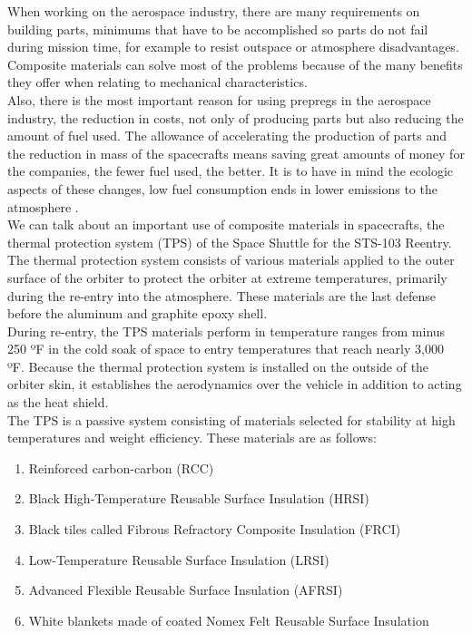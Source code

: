 When working on the aerospace industry, there are many requirements on building parts, minimums that have to be accomplished so parts do not fail during mission time, for example to resist outspace or atmosphere disadvantages. Composite materials can solve most of the problems because of the many benefits they offer when relating to mechanical characteristics.\\

Also, there is the most important reason for using prepregs in the aerospace industry, the reduction in costs, not only of producing parts but also reducing the amount of fuel used. The allowance of accelerating the production of parts and the reduction in mass of the spacecrafts means saving great amounts of money for the companies, the fewer fuel used, the better. It is to have in mind the ecologic aspects of these changes, low fuel consumption ends in lower emissions to the atmosphere \cite{plastico_orbita}\cite{Rodriguez2012}.\\

We can talk about an important use of composite materials in spacecrafts, the thermal protection system (TPS) of the Space Shuttle for the STS-103 Reentry.\\

The thermal protection system consists of various materials applied to the outer surface of the orbiter to protect the orbiter at extreme temperatures, primarily during the re-entry into the atmosphere. These materials are the last defense before the aluminum and graphite epoxy shell.\\

During re-entry, the TPS materials perform in temperature ranges from minus 250 ºF in the cold soak of space to entry temperatures that reach nearly 3,000 ºF. Because the thermal protection system is installed on the outside of the orbiter skin, it establishes the aerodynamics over the vehicle in addition to acting as the heat shield.\\

The TPS is a passive system consisting of materials selected for stability at high temperatures and weight efficiency. These materials are as follows:

\begin{enumerate}
	\item Reinforced carbon-carbon (RCC)
	\item Black High-Temperature Reusable Surface Insulation (HRSI)
	\item Black tiles called Fibrous Refractory Composite Insulation (FRCI)
	\item Low-Temperature Reusable Surface Insulation (LRSI)
	\item Advanced Flexible Reusable Surface Insulation (AFRSI)
	\item White blankets made of coated Nomex Felt Reusable Surface Insulation
\end{enumerate}

